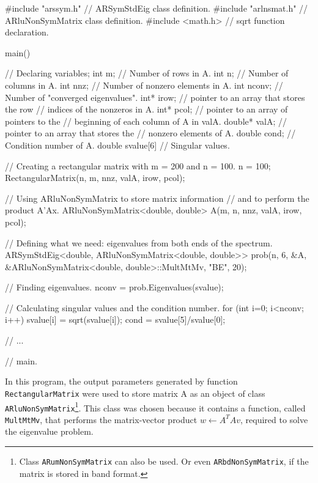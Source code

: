 \begin{cppcode}
#include "arssym.h"    // ARSymStdEig class definition.
#include "arlnsmat.h"  // ARluNonSymMatrix class definition.
#include <math.h>      // sqrt function declaration. 

main()
{
	// Declaring variables;
	int     m;          // Number of rows in A.
	int     n;          // Number of columns in A.
	int     nnz;        // Number of nonzero elements in A.
	int     nconv;      // Number of "converged eigenvalues".
	int*    irow;       // pointer to an array that stores the row
	                    // indices of the nonzeros in A.
	int*    pcol;       // pointer to an array of pointers to the
	                    // beginning of each column of A in valA.
	double* valA;       // pointer to an array that stores the
	                    // nonzero elements of A.
	double  cond;       // Condition number of A.
	double  svalue[6]   // Singular values.
	
	// Creating a rectangular matrix with m = 200 and n = 100.
	n = 100;
	RectangularMatrix(n, m, nnz, valA, irow, pcol);
	
	// Using ARluNonSymMatrix to store matrix information
	// and to perform the product A'Ax.
	ARluNonSymMatrix<double, double> A(m, n, nnz, valA, irow, pcol);
	
	// Defining what we need: eigenvalues from both ends of the spectrum.
	ARSymStdEig<double, ARluNonSymMatrix<double, double>>
		prob(n, 6, &A, &ARluNonSymMatrix<double, double>::MultMtMv, "BE", 20);
	
	// Finding eigenvalues.
	nconv = prob.Eigenvalues(svalue);
	
	// Calculating singular values and the condition number.
	for (int i=0; i<nconv; i++) svalue[i] = sqrt(svalue[i]);
	cond = svalue[5]/svalue[0];
	
	// ...
	
} // main.
\end{cppcode}

In this program, the output parameters generated by function \texttt{RectangularMatrix} were used to store matrix A as an object of class \texttt{ARluNonSymMatrix}\footnote{Class \texttt{ARumNonSymMatrix} can also be used. Or even \texttt{ARbdNonSymMatrix}, if the matrix is stored in band format.}. This class was chosen because it contains a function, called \texttt{MultMtMv}, that performs the matrix-vector product $w\leftarrow A^{T}Av$, required to solve the eigenvalue problem.

